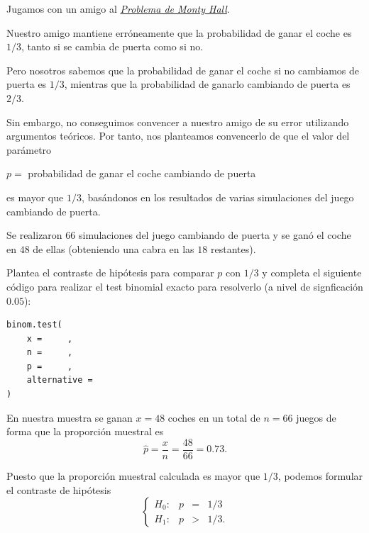 \documentclass[
  notoc,
  nobib,
  degree=mec]{mnye}
\begin{document}
\begin{ex}

Jugamos con un amigo al \href{https://www.mathwarehouse.com/monty-hall-simulation-online/}{\emph{Problema de Monty Hall}}.

Nuestro amigo mantiene erróneamente que la probabilidad de ganar el coche es \(1/3\), tanto si se cambia de puerta como si no.

Pero nosotros sabemos que la probabilidad de ganar el coche si no cambiamos de puerta es \(1/3\), mientras que la probabilidad de ganarlo cambiando de puerta es \(2/3\).

Sin embargo, no conseguimos convencer a nuestro amigo de su error utilizando argumentos teóricos. Por tanto, nos planteamos convencerlo de que el valor del parámetro

\begin{center}
\(p =\)
probabilidad de ganar el coche cambiando de puerta

\end{center}

es mayor que \(1/3\), basándonos en los resultados de varias simulaciones del juego cambiando de puerta.

Se realizaron \(66\) simulaciones del juego cambiando de puerta y se ganó el coche en \(48\) de ellas (obteniendo una cabra en las \(18\) restantes).

\begin{parts}

\item

Plantea el contraste de hipótesis para comparar \(p\) con \(1/3\) y completa el siguiente código para realizar el test binomial exacto para resolverlo (a nivel de signficación \(0.05\)):

\begin{verbatim}
binom.test(
    x =     ,
    n =     ,
    p =     ,
    alternative =
)
\end{verbatim}

\begin{sol}

En nuestra muestra se ganan \(x=48\) coches en un total de \(n=66\) juegos de forma que la proporción muestral es
\[
\hat p = \frac{x}{n} = \frac{48}{66}  = 0.73.
\]

Puesto que la proporción muestral calculada es mayor que \(1/3\), podemos formular el contraste de hipótesis
\[
  \left\{
  \begin{array}{lrcl}
    H_0:&p&=&1/3\\
    H_1:&p&>&1/3.
  \end{array}
  \right.
\]


\end{sol}
\end{parts}
\end{ex}
\end{document}
